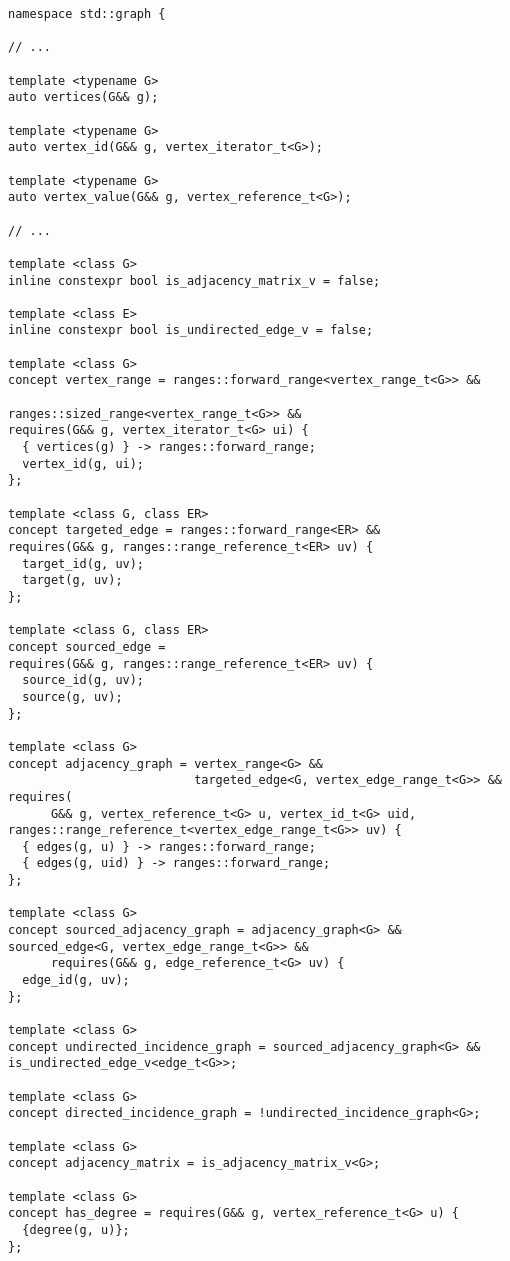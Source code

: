 \documentclass[10pt,onecolumn]{article}
\begin{document}
\begin{lstlisting}
namespace std::graph {

// ...

template <typename G>
auto vertices(G&& g);

template <typename G>
auto vertex_id(G&& g, vertex_iterator_t<G>);

template <typename G>
auto vertex_value(G&& g, vertex_reference_t<G>);

// ...

template <class G>
inline constexpr bool is_adjacency_matrix_v = false;

template <class E>
inline constexpr bool is_undirected_edge_v = false;

template <class G>
concept vertex_range = ranges::forward_range<vertex_range_t<G>> && 
                                   ranges::sized_range<vertex_range_t<G>> &&
requires(G&& g, vertex_iterator_t<G> ui) {
  { vertices(g) } -> ranges::forward_range;
  vertex_id(g, ui);
};

template <class G, class ER>
concept targeted_edge = ranges::forward_range<ER> && 
requires(G&& g, ranges::range_reference_t<ER> uv) {
  target_id(g, uv);
  target(g, uv);
};

template <class G, class ER>
concept sourced_edge = 
requires(G&& g, ranges::range_reference_t<ER> uv) {
  source_id(g, uv);
  source(g, uv);
};

template <class G>
concept adjacency_graph = vertex_range<G> && 
                          targeted_edge<G, vertex_edge_range_t<G>> &&   
requires(
      G&& g, vertex_reference_t<G> u, vertex_id_t<G> uid, ranges::range_reference_t<vertex_edge_range_t<G>> uv) {
  { edges(g, u) } -> ranges::forward_range;
  { edges(g, uid) } -> ranges::forward_range;
};

template <class G>
concept sourced_adjacency_graph = adjacency_graph<G> && sourced_edge<G, vertex_edge_range_t<G>> &&
      requires(G&& g, edge_reference_t<G> uv) {
  edge_id(g, uv);
};

template <class G>
concept undirected_incidence_graph = sourced_adjacency_graph<G> && is_undirected_edge_v<edge_t<G>>;

template <class G>
concept directed_incidence_graph = !undirected_incidence_graph<G>;

template <class G>
concept adjacency_matrix = is_adjacency_matrix_v<G>;

template <class G>
concept has_degree = requires(G&& g, vertex_reference_t<G> u) {
  {degree(g, u)};
};


\end{lstlisting}
\end{document}

